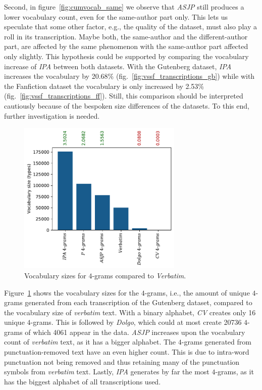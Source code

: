 Second, in figure~\ref{fig:cumvocab_same} we observe that \textit{ASJP} still produces a lower vocabulary count, even for the same-author part only.
This lets us speculate that some other factor, e.g., the quality of the dataset, must also play a roll in its transcription.
Maybe both, the same-author and the different-author part, are affected by the same phenomenon with the same-author part affected only slightly.
This hypothesis could be supported by comparing the vocabulary increase of \textit{IPA} between both datasets.
With the Gutenberg dataset, \textit{IPA} increases the vocabulary by 20.68\% (fig.~\ref{fig:vssf_transcriptions_gb}) while with the Fanfiction dataset the vocabulary is only increased by 2.53\% (fig.~\ref{fig:vssf_transcriptions_ff}).
Still, this comparison should be interpreted cautiously because of the bespoken size differences of the datasets.
To this end, further investigation is needed.\\
\begin{figure}
  \centering
  \includegraphics[width=0.7\textwidth]{figures/vocab_sizes_2021-07-28_14-42-08_gb_ngram}
  \caption{Vocabulary sizes for $4$-grams compared to \textit{Verbatim}.}
  \label{fig:vssf_ngrams_gb}
\end{figure}
Figure~\ref{fig:vssf_ngrams_gb} shows the vocabulary sizes for the $4$-grams, i.e., the amount of unique $4$-grams generated from each transcription of the Gutenberg dataset, compared to the vocabulary size of \textit{verbatim} text.
With a binary alphabet, \textit{CV} creates only 16 unique $4$-grams.
This is followed by \textit{Dolgo}, which could at most create 20736 $4$-grams of which 4061 appear in the data.
\textit{ASJP} increases upon the vocabulary count of \textit{verbatim} text, as it has a bigger alphabet.
The $4$-grams generated from punctuation-removed text have an even higher count.
This is due to intra-word punctuation not being removed and thus retaining many of the punctuation symbols from \textit{verbatim} text.
Lastly, \textit{IPA} generates by far the most $4$-grams, as it has the biggest alphabet of all transcriptions used.